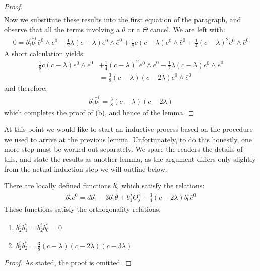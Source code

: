\begin{proof}
\begin{align*}
\end{align*}
%
Now we substitute these results into the first equation of the paragraph, and observe that all the terms involving a $\theta$ or a $\Theta$ cancel.  We are left with:
%
\begin{align*}
0 = b^i_1 \bar{b}^i_1 \bar{e}^0 \wedge e^0 - \frac{1}{2} \lambda ( c - \lambda ) e^0 \wedge \bar{e}^0 + \frac{1}{8} c (c- \lambda) e^0 \wedge \bar{e}^0 + \frac{1}{4} (c - \lambda)^2 e^0 \wedge \bar{e}^0
\end{align*}
%
A short calculation yields:
%
\begin{align*}
\frac{1}{8} c (c- \lambda) e^0 \wedge \bar{e}^0 &+ \frac{1}{4} (c - \lambda)^2 e^0 \wedge \bar{e}^0 - \frac{1}{2} \lambda ( c - \lambda ) e^0 \wedge \bar{e}^0\\
&= \frac{3}{8}(c - \lambda)(c - 2 \lambda) e^0 \wedge \bar{e}^0
\end{align*}
%
and therefore:
%
\begin{align}
b^i_1 \bar{b}^i_1 = \frac{3}{8}(c - \lambda)(c - 2 \lambda)
\end{align}
%
which completes the proof of (b), and hence of the lemma.
%
\end{proof}

At this point we would like to start an inductive process based on the procedure we used to arrive at the previous lemma.  Unfortunately, to do this honestly, one more step must be worked out separately.  We spare the readers the details of this, and state the results as another lemma, as the argument differs only slightly from the actual induction step we will outline below.

\begin{lem} There are locally defined functions $b^i_2$ which satisfy the relations:
%
\begin{align*}
b^i_2 e^0 = d b^i_1 - 3 b^i_1 \theta + b^j_1 \Theta^i_j + \frac{3}{4}(c - 2 \lambda) b^i_0 \bar{e}^0
\end{align*}
%
These functions satisfy the orthogonality relations:
%
\begin{enumerate}
\item $b^i_2 \bar{b}^i_1 = b^i_2 \bar{b}^i_0 = 0$
\item $b^i_2 \bar{b}^i_2 = \frac{3}{8} (c - \lambda)(c - 2\lambda)(c - 3 \lambda)$
\end{enumerate}
%
\end{lem}

\begin{proof} As stated, the proof is omitted.
\end{proof}


